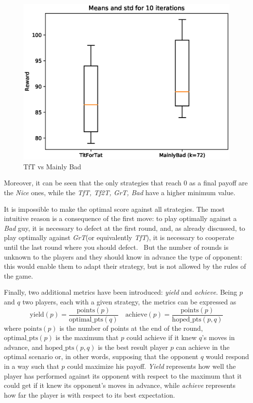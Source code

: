 \documentclass[journal,10pt,twoside]{IEEEtran}
\begin{document}
\begin{figure}[!ht]
    \centering
    \includegraphics[width=.7\columnwidth]{../img/ipd2p/ipd2p-boxplot-TitForTat-MainlyBad(k=72)}
    \caption{TfT vs Mainly Bad}
    \label{fig:boxmbvtft}
\end{figure}

Moreover, it can be seen that the only strategies that reach $0$ as a final payoff are the \textit{Nice} ones, while the \textit{TfT, Tf2T, GrT, Bad} have a higher minimum value.

It is impossible to make the optimal score against all strategies. The most intuitive reason is a consequence of the first move: to play optimally against a \textit{Bad} guy, it is necessary to defect at the first round, and, as already discussed, to play optimally against \textit{GrT}(or equivalently \textit{TfT}), it is necessary to cooperate until the last round where you should defect.~\cite{mathieu2017}
But the number of rounds is unknown to the players and they should know in advance the type of opponent: this would enable them to adapt their strategy, but is not allowed by the rules of the game. 

Finally, two additional metrics have been introduced: \textit{yield} and \textit{achieve}. 
Being $p$ and $q$ two players, each with a given strategy, the metrics can be expressed as
$$
\mathrm{yield}(p) = \frac{\mathrm{points}(p)}{\mathrm{optimal\_pts}(q)} \quad
\mathrm{achieve}(p) = \frac{\mathrm{points}(p)}{\mathrm{hoped\_pts}(p,q)}
$$
where $\mathrm{points}(p)$ is the number of points at the end of the round,
$\mathrm{optimal\_pts}(p)$ is the maximum that $p$ could achieve if it knew $q$'s moves in advance, and
$\mathrm{hoped\_pts}(p,q)$ is the best result player $p$ can achieve in the optimal scenario or, in other words, supposing that the opponent $q$ would respond in a way such that $p$ could maximize his payoff.
\textit{Yield} represents how well the player has performed against its opponent with respect to the maximum that it could get if it knew its opponent's moves in advance, while \textit{achieve} represents how far the player is with respect to its best expectation.
\end{document}

